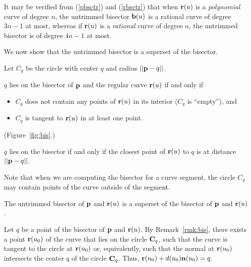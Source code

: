 \begin{rmk}
{\rm
It may be verified from (\ref{pbsctr}) and (\ref{rbsctr}) that when
${\bf r}(u)$ is a {\it polynomial\/} curve of degree $n$, the untrimmed
bisector ${\bf b}(u)$ is a rational curve of degree $3n-1$ at most,
whereas if ${\bf r}(u)$ is a {\it rational\/} curve of degree $n$, the
untrimmed bisector is of degree $4n-1$ at most.
}
\end{rmk}

We now show that the untrimmed bisector is a superset of the bisector.

\begin{dfn}
Let $C_{q}$ be the circle with center $q$ and radius $||{\bf p}-q||$.
\end{dfn}

\begin{rmk}
\label{rmk:bis}
$q$ lies on the bisector of ${\bf p}$ and the regular curve 
${\bf r}(u)$ if and only if 
\begin{itemize}
\item
$C_q$ does not contain any 
points of ${\bf r}(u)$ in its interior ($C_q$ is ``empty''), and 
\item
$C_q$ is tangent to ${\bf r}(u)$ in at least one 
point.
\end{itemize}
(Figure~\ref{fig:bis}.)
\end{rmk}
\prf
$q$ lies on the bisector if and only if the closest point of ${\bf r}(u)$
to $q$ is at distance $||{\bf p}-q||$.
\QED


Note that when we are computing the bisector for a curve segment,
the circle $C_q$ may contain points of the curve outside of the segment.

\begin{propn}
\label{p:superset}
The untrimmed bisector of ${\bf p}$ and ${\bf r}(u)$
is a superset of the bisector of ${\bf p}$ and ${\bf r}(u)$.
\end{propn}
\prf
Let $q$ be a point of the bisector of ${\bf p}$ and ${\bf r}(u)$.
By Remark~\ref{rmk:bis}, there exists a point ${\bf r}(u_{0})$ of the curve 
that lies on the circle ${\bf C}_q$,
such that the curve is tangent
to the circle at ${\bf r}(u_{0})$ or, equivalently, 
such that the normal at ${\bf r}(u_{0})$ 
intersects the center $q$ of the circle ${\bf C}_q$.
Thus, ${\bf r}(u_{0}) + d(u_{0}) {\bf n}(u_{0}) = q$.
\QED

